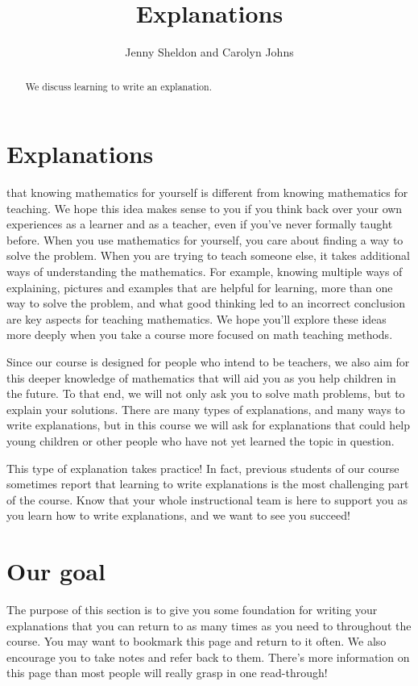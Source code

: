 \documentclass[noauthor,nooutcomes]{ximera}
\title{Explanations}
\author{Jenny Sheldon and Carolyn Johns}
\begin{document}
\begin{abstract}
We discuss learning to write an explanation.
\end{abstract}
\maketitle

\section{Explanations}



  that knowing mathematics for yourself is different from knowing mathematics for teaching. We hope this idea makes sense to you if you think back over your own experiences as a learner and as a teacher, even if you've never formally taught before. When you use mathematics for yourself, you care about finding a way to solve the problem. When you are trying to teach someone else, it takes additional ways of understanding the mathematics. For example, knowing multiple ways of explaining, pictures and examples that are helpful for learning, more than one way to solve the problem, and what good thinking led to an incorrect conclusion are key aspects for teaching mathematics. We hope you'll explore these ideas more deeply when you take a course more focused on math teaching methods.

Since our course is designed for people who intend to be teachers, we also aim for this deeper knowledge of mathematics that will aid you as you help children in the future. To that end, we will not only ask you to solve math problems, but to explain your solutions. There are many types of explanations, and many ways to write explanations, but in this course we will ask for explanations that could help young children or other people who have not yet learned the topic in question.

This type of explanation takes practice! In fact, previous students of our course sometimes report that learning to write explanations is the most challenging part of the course. Know that your whole instructional team is here to support you as you learn how to write explanations, and we want to see you succeed!

\section{Our goal}
The purpose of this section is to give you some foundation for writing your explanations that you can return to as many times as you need to throughout the course. You may want to bookmark this page and return to it often. We also encourage you to take notes and refer back to them. There's more information on this page than most people will really grasp in one read-through!
\end{document}
